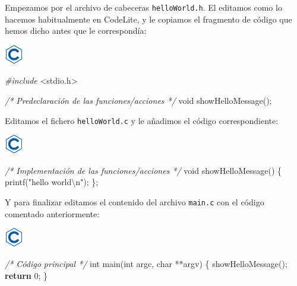 \documentclass[
]{book}
\newenvironment{Shaded}{\begin{snugshade}}{\end{snugshade}}
\newcommand{\CommentTok}[1]{\textcolor[rgb]{0.56,0.35,0.01}{\textit{#1}}}
\newcommand{\ControlFlowTok}[1]{\textcolor[rgb]{0.13,0.29,0.53}{\textbf{#1}}}
\newcommand{\DataTypeTok}[1]{\textcolor[rgb]{0.13,0.29,0.53}{#1}}
\newcommand{\DecValTok}[1]{\textcolor[rgb]{0.00,0.00,0.81}{#1}}
\newcommand{\ImportTok}[1]{#1}
\newcommand{\NormalTok}[1]{#1}
\newcommand{\PreprocessorTok}[1]{\textcolor[rgb]{0.56,0.35,0.01}{\textit{#1}}}
\newcommand{\SpecialCharTok}[1]{\textcolor[rgb]{0.00,0.00,0.00}{#1}}
\newcommand{\StringTok}[1]{\textcolor[rgb]{0.31,0.60,0.02}{#1}}
\begin{document}
Empezamos por el archivo de cabeceras \texttt{helloWorld.h}. El editamos como lo hacemos habitualmente en CodeLite, y le copiamos el fragmento de código que hemos dicho antes que le correspondía:

\includegraphics{./img/c.png}

\begin{Shaded}
\begin{Highlighting}[]
\PreprocessorTok{\#include }\ImportTok{\textless{}stdio.h\textgreater{}}

\CommentTok{/* Predeclaración de las funciones/acciones */}
\DataTypeTok{void}\NormalTok{ showHelloMessage();}
\end{Highlighting}
\end{Shaded}

Editamos el fichero \texttt{helloWorld.c} y le añadimos el código correspondiente:

\includegraphics{./img/c.png}

\begin{Shaded}
\begin{Highlighting}[]
\CommentTok{/* Implementación de las funciones/acciones */}
\DataTypeTok{void}\NormalTok{ showHelloMessage() \{}
\NormalTok{    printf(}\StringTok{"hello world}\SpecialCharTok{\textbackslash{}n}\StringTok{"}\NormalTok{);}
\NormalTok{\};}
\end{Highlighting}
\end{Shaded}

Y para finalizar editamos el contenido del archivo \texttt{main.c} con el código comentado anteriormente:

\includegraphics{./img/c.png}

\begin{Shaded}
\begin{Highlighting}[]
\CommentTok{/* Código principal */}
\DataTypeTok{int}\NormalTok{ main(}\DataTypeTok{int}\NormalTok{ argc, }\DataTypeTok{char}\NormalTok{ **argv) \{}
\NormalTok{    showHelloMessage();}
    \ControlFlowTok{return} \DecValTok{0}\NormalTok{;}
\NormalTok{\}}
\end{Highlighting}
\end{Shaded}
\end{document}
